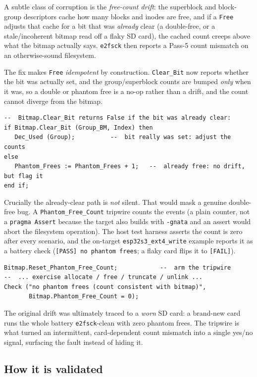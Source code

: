 A subtle class of corruption is the \emph{free-count drift}: the superblock and
block-group descriptors cache how many blocks and inodes are free, and if a
\texttt{Free} adjusts that cache for a bit that was \emph{already} clear (a
double-free, or a stale/incoherent bitmap read off a flaky SD card), the cached
count creeps above what the bitmap actually says. \texttt{e2fsck} then reports a
Pass-5 count mismatch on an otherwise-sound filesystem.

The fix makes \texttt{Free} \emph{idempotent} by construction. \texttt{Clear\_Bit}
now reports whether the bit was actually set, and the group/superblock counts are
bumped \emph{only} when it was, so a double or phantom free is a no-op rather
than a drift, and the count cannot diverge from the bitmap.

\begin{lstlisting}
--  Bitmap.Clear_Bit returns False if the bit was already clear:
if Bitmap.Clear_Bit (Group_BM, Index) then
   Dec_Used (Group);          --  bit really was set: adjust the counts
else
   Phantom_Frees := Phantom_Frees + 1;   --  already free: no drift, but flag it
end if;
\end{lstlisting}

Crucially the already-clear path is \emph{not} silent. That would mask a genuine
double-free bug. A \texttt{Phantom\_Free\_Count} tripwire counts the events (a plain
counter, not a \texttt{pragma Assert} because the target also builds with
\texttt{-gnata} and an assert would abort the filesystem operation). The host test
harness asserts the count is zero after every scenario, and the on-target
\texttt{esp32s3\_ext4\_write} example reports it as a battery check
(\texttt{[PASS] no phantom frees}; a flaky card flips it to \texttt{[FAIL]}).

\begin{lstlisting}
Bitmap.Reset_Phantom_Free_Count;            --  arm the tripwire
--  ... exercise allocate / free / truncate / unlink ...
Check ("no phantom frees (count consistent with bitmap)",
       Bitmap.Phantom_Free_Count = 0);
\end{lstlisting}

The original drift was ultimately traced to a \emph{worn} SD card: a brand-new card
runs the whole battery \texttt{e2fsck}-clean with zero phantom frees. The tripwire
is what turned an intermittent, card-dependent count mismatch into a single
yes/no signal, surfacing the fault instead of hiding it.

\subsection{How it is validated}

